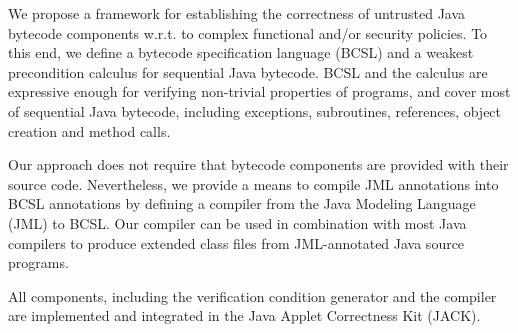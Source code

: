 
We propose a framework for establishing the correctness of untrusted
Java bytecode components w.r.t. to complex functional and/or security
policies. To this end, we define a bytecode specification language
(BCSL) and a weakest precondition calculus for sequential Java
bytecode. BCSL and the calculus are expressive enough for verifying
non-trivial properties of programs, and cover most of sequential Java
bytecode, including exceptions, subroutines, references, object
creation and method calls.

Our approach does not require that bytecode components are provided
with their source code. Nevertheless, we provide a means to
compile JML annotations into BCSL annotations 
by defining a compiler from the Java Modeling Language (JML) to BCSL.
Our compiler can be used in combination with most Java compilers to
produce extended class files from JML-annotated Java source programs.

All components, including the verification condition generator and the
compiler are implemented and integrated in the Java Applet Correctness
Kit (JACK).
